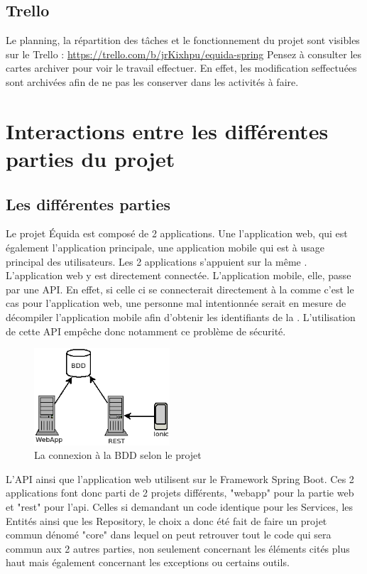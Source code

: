 		\subsection{Trello}
			Le planning, la répartition des tâches et le fonctionnement du projet sont visibles sur le Trello : \url{https://trello.com/b/jrKixhpu/equida-spring}
			Pensez à consulter les cartes archiver pour voir le travail effectuer. En effet, les modification seffectuées sont archivées afin de ne pas les conserver dans les activités à faire.

	\section{Interactions entre les différentes parties du projet}
		\subsection{Les différentes parties}
			Le projet Équida est composé de 2 applications. Une l'application web, qui est également l'application principale, une application mobile qui est à usage principal des utilisateurs. Les 2 applications s'appuient sur la même \bdd{}. L'application web y est directement connectée. L'application mobile, elle, passe par une API. En effet, si celle ci se connecterait directement à la \bdd{} comme c'est le cas pour l'application web, une personne mal intentionnée serait en mesure de décompiler l'application mobile afin d'obtenir les identifiants de la \bdd{}. L'utilisation de cette API empêche donc notamment ce problème de sécurité.

			\begin{figure}[H]
				\centering\includegraphics[width=0.45\textwidth, keepaspectratio]{res/diag_infra.png}
				\caption{La connexion à la BDD selon le projet}
			\end{figure}

			L'API ainsi que l'application web utilisent sur le Framework Spring Boot. Ces 2 applications font donc parti de 2 projets différents, "webapp" pour la partie web et "rest" pour l'api. Celles si demandant un code identique pour les Services, les Entités ainsi que les Repository, le choix a donc été fait de faire un projet commun dénomé "core" dans lequel on peut retrouver tout le code qui sera commun aux 2 autres parties, non seulement concernant les éléments cités plus haut mais également concernant les exceptions ou certains outils.

